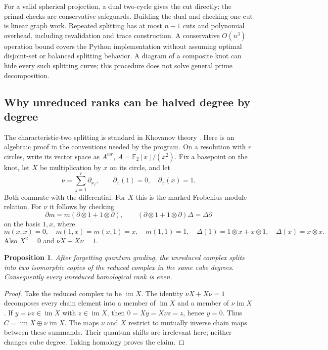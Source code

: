 \documentclass[11pt]{article}
\newtheorem{proposition}[theorem]{Proposition}
\theoremstyle{definition}\newtheorem{definition}[theorem]{Definition}
\theoremstyle{remark}\newtheorem{remark}[theorem]{Remark}
\newcommand{\F}{\mathbb F_2}
\newcommand{\im}{\operatorname{im}}
\begin{document}
For a valid spherical projection, a dual two-cycle gives the cut directly;
the primal checks are conservative safeguards. Building the dual and checking
one cut is linear graph work. Repeated splitting has at most $n-1$ cuts and
polynomial overhead, including revalidation and trace construction. A
conservative $O(n^3)$ operation bound covers the Python implementation without
assuming optimal disjoint-set or balanced splitting behavior. A diagram of a
composite knot can hide every such splitting curve; this procedure does not
solve general prime decomposition.

\subsection{Why unreduced ranks can be halved degree by degree}
The characteristic-two splitting is standard in Khovanov theory
\cite{Shumakovitch,Wigderson}. Here is an algebraic proof in the conventions
needed by the program. On a resolution with $r$ circles, write its vector space
as $A^{\otimes r}$, $A=\F[x]/(x^2)$. Fix a basepoint on the knot, let $X$ be
multiplication by $x$ on its circle, and let
\[
 \nu=\sum_{j=1}^r\partial_{x_j},\qquad
 \partial_x(1)=0,\quad\partial_x(x)=1.
\]
Both commute with the differential. For $X$ this is the marked Frobenius-module
relation. For $\nu$ it follows by checking
\[
 \partial m=m(\partial\otimes1+1\otimes\partial),\qquad
 (\partial\otimes1+1\otimes\partial)\Delta=\Delta\partial
\]
on the basis $1,x$, where
\[
 m(x,x)=0,\quad m(1,x)=m(x,1)=x,\quad m(1,1)=1,
 \quad\Delta(1)=1\otimes x+x\otimes1,\quad\Delta(x)=x\otimes x.
\]
Also $X^2=0$ and $\nu X+X\nu=1$.

\begin{proposition}\label{prop:split}
After forgetting quantum grading, the unreduced complex splits into two
isomorphic copies of the reduced complex in the same cube degrees.
Consequently every unreduced homological rank is even.
\end{proposition}
\begin{proof}
Take the reduced complex to be $\im X$. The identity
$\nu X+X\nu=1$ decomposes every chain element into a member of $\im X$ and
a member of $\nu\im X$. If $y=\nu z\in\im X$ with $z\in\im X$, then
$0=Xy=X\nu z=z$, hence $y=0$. Thus
$C=\im X\oplus\nu\im X$. The maps $\nu$ and $X$ restrict to mutually
inverse chain maps between these summands. Their quantum shifts are irrelevant
here; neither changes cube degree. Taking homology proves the claim.
\end{proof}
\end{document}
